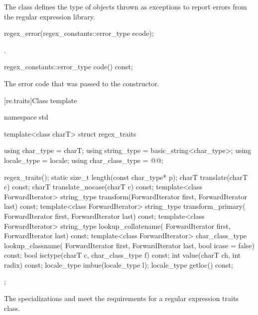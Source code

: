 \pnum
The class  defines the type of objects thrown as
exceptions to report errors from the regular expression library.

%
\begin{itemdecl}
regex_error(regex_constants::error_type ecode);
\end{itemdecl}

\begin{itemdescr}
\pnum
\ensures
{}.
\end{itemdescr}

%
%
\begin{itemdecl}
regex_constants::error_type code() const;
\end{itemdecl}

\begin{itemdescr}
\pnum
\returns
The error code that was passed to the constructor.
\end{itemdescr}

[re.traits]{Class template }
%
\begin{codeblock}
namespace std {
  template<class charT>
  struct regex_traits {
    using char_type       = charT;
    using string_type     = basic_string<char_type>;
    using locale_type     = locale;
    using char_class_type = @@;

    regex_traits();
    static size_t length(const char_type* p);
    charT translate(charT c) const;
    charT translate_nocase(charT c) const;
    template<class ForwardIterator>
      string_type transform(ForwardIterator first, ForwardIterator last) const;
    template<class ForwardIterator>
      string_type transform_primary(
        ForwardIterator first, ForwardIterator last) const;
    template<class ForwardIterator>
      string_type lookup_collatename(
        ForwardIterator first, ForwardIterator last) const;
    template<class ForwardIterator>
      char_class_type lookup_classname(
        ForwardIterator first, ForwardIterator last, bool icase = false) const;
    bool isctype(charT c, char_class_type f) const;
    int value(charT ch, int radix) const;
    locale_type imbue(locale_type l);
    locale_type getloc() const;
  };
}
\end{codeblock}

\pnum
{}%
%
The specializations  and
 meet the
requirements for a regular expression traits class.

